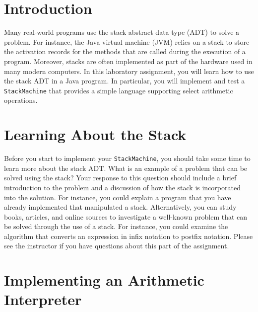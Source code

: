 


\usepackage[compact]{titlesec}


\section*{Introduction}

  Many real-world programs use the stack abstract data type (ADT) to solve a problem.  For instance, the Java virtual
  machine (JVM) relies on a stack to store the activation records for the methods that are called during the execution
  of a program.  Moreover, stacks are often implemented as part of the hardware used in many modern computers. In this
  laboratory assignment, you will learn how to use the stack ADT in a Java program.  In particular, you will implement
  and test a {\tt StackMachine} that provides a simple language supporting select arithmetic operations.

\section*{Learning About the Stack}

  Before you start to implement your {\tt StackMachine}, you should take some time to learn more about the stack ADT.
  What is an example of a problem that can be solved using the stack? Your response to this question should include a
  brief introduction to the problem and a discussion of how the stack is incorporated into the solution. For instance,
  you could explain a program that you have already implemented that manipulated a stack. Alternatively, you can study
  books, articles, and online sources to investigate a well-known problem that can be solved through the use of a stack.
  For instance, you could examine the algorithm that converts an expression in infix notation to postfix notation.
  Please see the instructor if you have questions about this part of the assignment.

\section*{Implementing an Arithmetic Interpreter}
 
